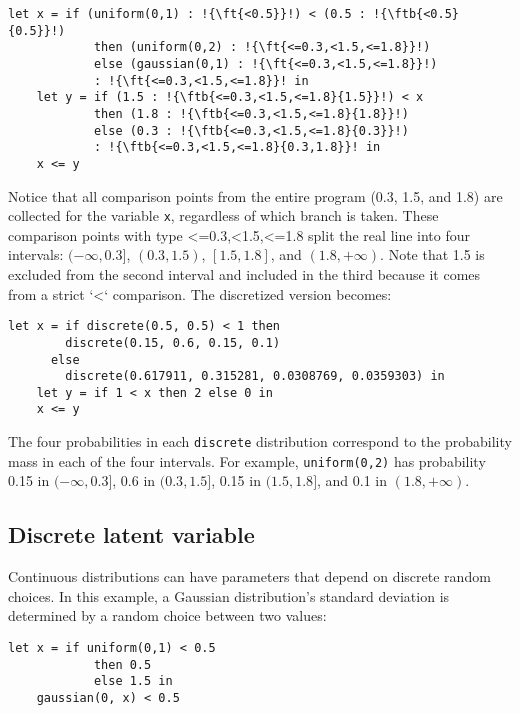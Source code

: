 \documentclass[acmsmall,screen,dvipsnames,x11names,nonacm,anonymous,review]{acmart}
\newcommand{\codetype}[1]{\textcolor{typecolor}{\ttfamily\small#1}}
\newcommand{\ftb}[2]{\codetype{float[\{#1\}; \{#2\}]}}  %
\newcommand{\ft}[1]{\codetype{float[\{#1\}; T]}}        %
\begin{document}
\begin{lstlisting}[aboveskip=1em,belowskip=1em,escapechar=!]
    let x = if (uniform(0,1) : !{\ft{<0.5}}!) < (0.5 : !{\ftb{<0.5}{0.5}}!)
            then (uniform(0,2) : !{\ft{<=0.3,<1.5,<=1.8}}!)
            else (gaussian(0,1) : !{\ft{<=0.3,<1.5,<=1.8}}!)
            : !{\ft{<=0.3,<1.5,<=1.8}}! in
    let y = if (1.5 : !{\ftb{<=0.3,<1.5,<=1.8}{1.5}}!) < x
            then (1.8 : !{\ftb{<=0.3,<1.5,<=1.8}{1.8}}!)
            else (0.3 : !{\ftb{<=0.3,<1.5,<=1.8}{0.3}}!)
            : !{\ftb{<=0.3,<1.5,<=1.8}{0.3,1.8}}! in
    x <= y
\end{lstlisting}

\noindent Notice that all comparison points from the entire program (0.3, 1.5, and 1.8) are collected for the variable \texttt{x}, regardless of which branch is taken. These comparison points with type \codetype{<=0.3,<1.5,<=1.8} split the real line into four intervals: $(-\infty, 0.3]$, $(0.3, 1.5)$, $[1.5, 1.8]$, and $(1.8, +\infty)$. Note that 1.5 is excluded from the second interval and included in the third because it comes from a strict `<` comparison. The discretized version becomes:

\begin{lstlisting}[aboveskip=1em,belowskip=1em]
    let x = if discrete(0.5, 0.5) < 1 then
        discrete(0.15, 0.6, 0.15, 0.1)
      else
        discrete(0.617911, 0.315281, 0.0308769, 0.0359303) in
    let y = if 1 < x then 2 else 0 in
    x <= y
\end{lstlisting}

\noindent The four probabilities in each \texttt{discrete} distribution correspond to the probability mass in each of the four intervals. For example, \texttt{uniform(0,2)} has probability 0.15 in $(-\infty, 0.3]$, 0.6 in $(0.3, 1.5]$, 0.15 in $(1.5, 1.8]$, and 0.1 in $(1.8, +\infty)$.

\subsection{Discrete latent variable}

Continuous distributions can have parameters that depend on discrete random choices. In this example, a Gaussian distribution's standard deviation is determined by a random choice between two values:

\begin{lstlisting}[aboveskip=1em,belowskip=1em,escapechar=!]
    let x = if uniform(0,1) < 0.5 
            then 0.5
            else 1.5 in
    gaussian(0, x) < 0.5
\end{lstlisting}
\end{document}
